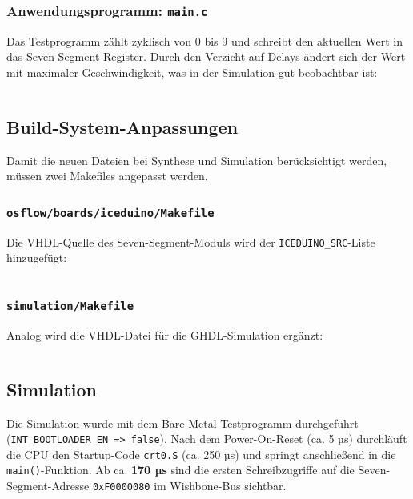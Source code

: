 \subsubsection{Anwendungsprogramm: \texttt{main.c}}

Das Testprogramm zählt zyklisch von 0 bis 9 und schreibt den aktuellen Wert in das Seven-Segment-Register. Durch den Verzicht auf Delays ändert sich der Wert mit maximaler Geschwindigkeit, was in der Simulation gut beobachtbar ist:

\inputminted[linenos,frame=single,fontsize=\footnotesize]{c}{A6_Abgabe/iceduino_setup/sw/programs/iceduino_led/main.c}


\subsection{Build-System-Anpassungen}

Damit die neuen Dateien bei Synthese und Simulation berücksichtigt werden, müssen zwei Makefiles angepasst werden.

\subsubsection{\texttt{osflow/boards/iceduino/Makefile}}

Die VHDL-Quelle des Seven-Segment-Moduls wird der \texttt{ICEDUINO\_SRC}-Liste hinzugefügt:

\inputminted[linenos,frame=single,fontsize=\footnotesize,firstline=62,lastline=73]{makefile}{A6_Abgabe/iceduino_setup/osflow/boards/iceduino/Makefile}

\subsubsection{\texttt{simulation/Makefile}}

Analog wird die VHDL-Datei für die GHDL-Simulation ergänzt:

\inputminted[linenos,frame=single,fontsize=\footnotesize,firstline=49,lastline=62]{makefile}{A6_Abgabe/iceduino_setup/simulation/Makefile}

\subsection{Simulation}

Die Simulation wurde mit dem Bare-Metal-Testprogramm durchgeführt (\texttt{INT\_BOOTLOADER\_EN => false}). Nach dem Power-On-Reset (ca. 5 µs) durchläuft die CPU den Startup-Code \texttt{crt0.S} (ca. 250 µs) und springt anschließend in die \texttt{main()}-Funktion. Ab ca. \textbf{170 µs} sind die ersten Schreibzugriffe auf die Seven-Segment-Adresse \texttt{0xF0000080} im Wishbone-Bus sichtbar.

